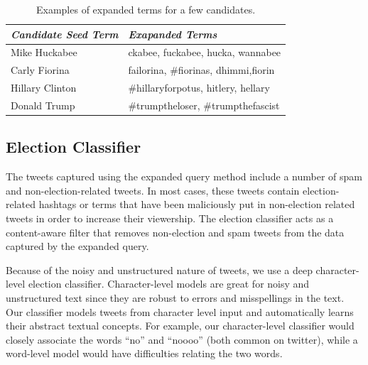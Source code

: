 \documentclass[letterpaper]{article}
\begin{document}

\begin{table}[h]
\centering
\small
\begin{tabular}{|l|l|}
\hline %
\emph{Candidate Seed Term} & \emph{Exapanded Terms} \\\hline 
Mike Huckabee & ckabee, fuckabee, hucka, wannabee \\\hline
Carly Fiorina & failorina, \#fiorinas, dhimmi,fiorin\\\hline
Hillary Clinton &  \#hillaryforpotus, hitlery, hellary \\\hline
Donald Trump &  \#trumptheloser, \#trumpthefascist \\\hline
\end{tabular}
\caption{Examples of expanded terms for a few candidates.}
\label{tab:expand_1}
\end{table}




\subsection{Election Classifier}
The tweets captured using the expanded query method include a number of spam and non-election-related tweets. In most cases, these tweets contain election-related hashtags or terms that have been maliciously put in non-election related tweets in order to increase their viewership. The election classifier acts as a content-aware filter that removes non-election and spam tweets from the data captured by the expanded query. 

Because of the noisy and unstructured nature of tweets, we use a deep character-level election classifier. Character-level models are great for noisy and unstructured text since they are robust to errors and misspellings in the text. Our classifier models tweets from character level input and automatically learns their abstract textual concepts. For example, our character-level classifier would closely associate the words ``no'' and ``noooo'' (both common on twitter), while a word-level model would have difficulties relating the two words. 
\end{document}
